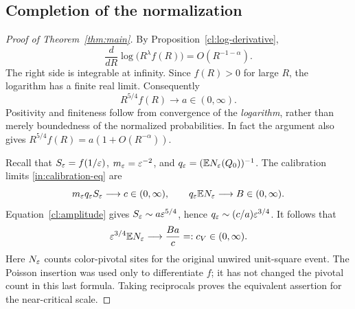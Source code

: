 \subsection{Completion of the normalization}

\begin{proof}[Proof of Theorem~\ref{thm:main}]
By Proposition~\ref{cl:log-derivative},
\[
 \frac{d}{dR}\log\bigl(R^\lambda f(R)\bigr)=O(R^{-1-\alpha}).
\]
The right side is integrable at infinity. Since $f(R)>0$ for
large $R$, the logarithm has a finite real limit. Consequently
\begin{equation}\label{cl:amplitude}
 R^{5/4}f(R)\longrightarrow a\in(0,\infty).
\end{equation}
Positivity and finiteness follow from convergence of the
\emph{logarithm}, rather than merely boundedness of the normalized
probabilities. In fact the argument also gives
$R^{5/4}f(R)=a(1+O(R^{-\alpha}))$.

Recall that $S_\varepsilon=f(1/\varepsilon)$,
$m_\varepsilon=\varepsilon^{-2}$, and
$q_\varepsilon=(\mathbb E N_\varepsilon(Q_0))^{-1}$.
The calibration limits \eqref{in:calibration-eq} are
\[
 m_\varepsilon q_\varepsilon S_\varepsilon\longrightarrow c\in(0,\infty),
 \qquad
 q_\varepsilon\mathbb E N_\varepsilon\longrightarrow B\in(0,\infty).
\]
Equation~\eqref{cl:amplitude} gives
$S_\varepsilon\sim a\varepsilon^{5/4}$, hence
$q_\varepsilon\sim(c/a)\varepsilon^{3/4}$. It follows that
\[
 \varepsilon^{3/4}\mathbb E N_\varepsilon\longrightarrow \frac{Ba}{c}
 =:c_V\in(0,\infty).
\]
Here $N_\varepsilon$ counts color-pivotal sites for the original unwired
unit-square event. The Poisson insertion was used only to
differentiate $f$; it has not changed the pivotal count in this
last formula. Taking reciprocals proves the equivalent assertion
for the near-critical scale.
\end{proof}
